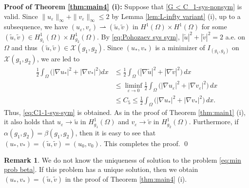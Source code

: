 \documentclass[a4paper,10pt,reqno]{amsart}
\theoremstyle{definition}
\newtheorem{remark}[theorem]{Remark}
\newcommand{\calX}{{\mathcal X}}
\newcommand{\tilu}{{\widetilde u}}
\newcommand{\tilv}{{\widetilde v}}
\newcommand{\al}{{\alpha}}
\newcommand{\ve}{{\varepsilon}}
\newcommand{\Om}{{\Omega}}
\numberwithin{equation}{section}
\begin{document}
 \smallskip
{\bf Proof of Theorem \ref{thm:main4} (i):}
Suppose that \eqref{G < C_1-sys-nonsym} is valid.
Since $ \| u_\ve \|_\infty + \| v_\ve \|_\infty \leq 2$ by Lemma \ref{lem:L-infty variant} (i), up to a subsequence, we have
$(u_\ve,v_\ve ) \rightharpoonup (\tilde{u},\tilv) $ in $H^1 (\Omega) \times H^1(\Omega)$ for some $(\tilu ,\tilv) \in H^1_{g_1}(\Omega) \times  H^1_{g_2}(\Omega)$.
By \eqref{eq:Pohozaev sys sym},  $|\tilu |^2+|\tilv |^2 =2$ a.e. on $\Om$ and thus $ (\tilu,\tilv) \in \calX(g_1,g_2)$.
Since $(u_*,v_*)$ is a   minimizer of $I_{(g_1,g_2)}$ on $\calX(g_1,g_2)$, we are led to 
\begin{align*}
\frac{1}{2} \int_\Omega  \big( |\nabla u_*|^2+|\nabla v_* |^2 \big) dx & \leq \frac{1}{2} \int_\Omega  \big( |\nabla \tilu|^2+|\nabla \tilv |^2 \big)\,dx \\
& \leq \liminf_{\ve \to 0}  \frac{1}{2}\int_\Omega  \big( |\nabla u_\ve|^2+|\nabla v_\ve |^2 \big) \,dx \\
&\leq C_5 \le
\frac{1}{2} \int_\Omega \big( |\nabla u_*|^2 + |\nabla v_*|^2 \big)\, dx  .
\end{align*}
Thus, \eqref{eq:C1-1-sys-sym}  is obtained.
As in the proof of Theorem \ref{thm:main1} (i), it also holds that
   $u_\ve \to \tilu$ in $H_{g_1}^1(\Om)$ and  $v_\ve \to \tilv$ in $H_{g_2}^1(\Om)$.
Furthermore, if $\al(g_1,g_2)=\beta(g_1,g_2)$, then it is easy to see that $(u_*,v_*)=(\tilu,\tilv)=(u_0,v_0)$.
This completes the proof.
\qed
\smallskip

\smallskip
\begin{remark}\label{rmk:tilu vs u*}
We do not know the uniqueness of solution to the problem \eqref{eq:min prob beta}.
If this problem has a unique solution, then we obtain $(u_*,v_*)=(\tilu,\tilv)$ in the proof of Theorem \ref{thm:main4} (i).
\end{remark}
\smallskip
\end{document}

